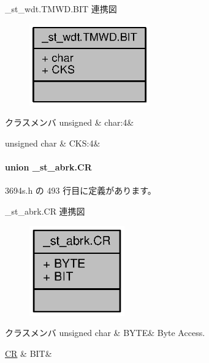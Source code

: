\+\_\+st\+\_\+wdt.\+T\+M\+W\+D.\+B\+I\+T 連携図
\nopagebreak
\begin{figure}[H]
\begin{center}
\leavevmode
\includegraphics[width=147pt]{d1/df8/struct__st__wdt_8TMWD_8BIT__coll__graph}
\end{center}
\end{figure}
\begin{DoxyFields}{クラスメンバ}
unsigned\label{3694s_8h_aa87deb01c5f539e6bda34829c8ef2368}
&
char\+:4&
\\
\hline

unsigned char\label{3694s_8h_a62e08e3df930b3022644f9943263a758}
&
C\+K\+S\+:4&
\\
\hline

\end{DoxyFields}
\label{union__st__abrk_8CR}
\paragraph{union \+\_\+st\+\_\+abrk.\+C\+R}


 3694s.\+h の 493 行目に定義があります。



\+\_\+st\+\_\+abrk.\+C\+R 連携図
\nopagebreak
\begin{figure}[H]
\begin{center}
\leavevmode
\includegraphics[width=116pt]{d5/d6b/union__st__abrk_8CR__coll__graph}
\end{center}
\end{figure}
\begin{DoxyFields}{クラスメンバ}
unsigned char\label{3694s_8h_ae409eb2ba6eb6801f52763ae370c350e}
&
B\+Y\+T\+E&
Byte Access. \\
\hline

\hyperlink{3694s_8h_d6/d55/struct__st__abrk_8CR_8BIT}{C\+R}\label{3694s_8h_adb957fdc8000e1eef04a243f5199aa52}
&
B\+I\+T&
\\
\hline

\end{DoxyFields}
\label{struct__st__abrk_8CR_8BIT}
